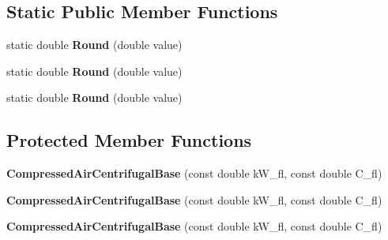 \subsection*{Static Public Member Functions}
\begin{DoxyCompactItemize}
\item 
\mbox{\label{class_compressed_air_centrifugal_base_a96a15c80342be54ec294c92f39a8dd6f}} 
static double {\bfseries Round} (double value)
\item 
\mbox{\label{class_compressed_air_centrifugal_base_a96a15c80342be54ec294c92f39a8dd6f}} 
static double {\bfseries Round} (double value)
\item 
\mbox{\label{class_compressed_air_centrifugal_base_a96a15c80342be54ec294c92f39a8dd6f}} 
static double {\bfseries Round} (double value)
\end{DoxyCompactItemize}
\subsection*{Protected Member Functions}
\begin{DoxyCompactItemize}
\item 
\mbox{\label{class_compressed_air_centrifugal_base_ad94f627b6797b0c84fbf6ef361736ce2}} 
{\bfseries Compressed\+Air\+Centrifugal\+Base} (const double k\+W\+\_\+fl, const double C\+\_\+fl)
\item 
\mbox{\label{class_compressed_air_centrifugal_base_ad94f627b6797b0c84fbf6ef361736ce2}} 
{\bfseries Compressed\+Air\+Centrifugal\+Base} (const double k\+W\+\_\+fl, const double C\+\_\+fl)
\item 
\mbox{\label{class_compressed_air_centrifugal_base_ad94f627b6797b0c84fbf6ef361736ce2}} 
{\bfseries Compressed\+Air\+Centrifugal\+Base} (const double k\+W\+\_\+fl, const double C\+\_\+fl)
\end{DoxyCompactItemize}
